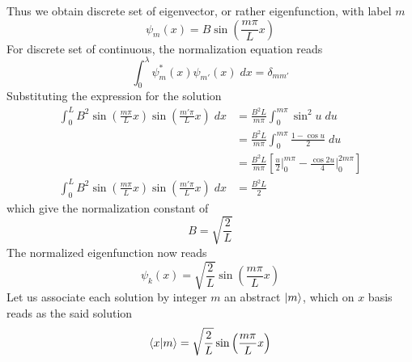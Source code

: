 \documentclass[../../../main.tex]{subfiles}
\begin{document}
Thus we obtain discrete set of  eigenvector, or rather eigenfunction, with label $m$
\begin{equation*}
	\psi_m(x)=B \sin \left( \frac{m\pi }{L }x \right)
\end{equation*}
For discrete set of continuous, the normalization equation reads
\begin{equation*}
	\int_{0 }^{\lambda} \psi_m ^*(x)\psi_{m'}(x)\;dx=\delta_{mm'}
\end{equation*}
Substituting the expression for the solution  
\begin{align*}
	\int_{0}^{L}B^2 \sin \left( \frac{m\pi }{L }x  \right) \sin \left( \frac{m'\pi }{L }x  \right) \;dx&=\frac{B^2 L }{m\pi }\int_{0 }^{m\pi } \sin^2u\;du\\
	&=\frac{B^2L }{m\pi}\int_{0 }^{m\pi }\frac{1-\cos u}{2}\;du\\
	&=\frac{B^2L }{m\pi} \left[ \frac{u }{2}\bigg|_{0 }^{m\pi}-\frac{\cos 2u}{4}\bigg|_{0 }^{2m\pi} \right] \\
	\int_{0}^{L}B^2 \sin \left( \frac{m\pi }{L }x  \right) \sin \left( \frac{m'\pi }{L }x  \right) \;dx&=\frac{B^2L}{2}
\end{align*}
which give the normalization constant of 
\begin{equation*}
	B=\sqrt{\frac{2 }{L }}
\end{equation*} 
The normalized eigenfunction now reads 
\begin{equation*}
	\psi_k(x)=\sqrt{\frac{ 2 }{L  }}\sin \left( \frac{m\pi }{L }x  \right) 
\end{equation*}
Let us associate each solution by integer $m$ an abstract $\ket{m}$, which on $x$ basis reads as the said solution
\begin{equation*}
	\braket{x|m}=\sqrt{\frac{ 2 }{L  }}\sin \left( \frac{m\pi }{L }x  \right) 
\end{equation*}
\end{document}
